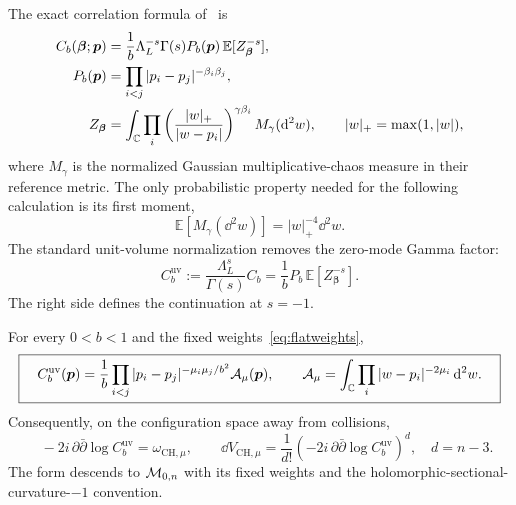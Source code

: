 The exact correlation formula of~\cite[eqs.~(2.11)--(2.15)]{KRV}
is
\begin{align}
 C_b(\boldsymbol\beta;\boldsymbol p)
   &=\frac1b\Lambda_L^{-s}\Gamma(s)
      P_b(\boldsymbol p)\,\mathbb E[Z_{\boldsymbol\beta}^{-s}],
       \label{eq:LiouvilleGMC}\\
 P_b(\boldsymbol p)
   &=\prod_{i<j}|p_i-p_j|^{-\beta_i\beta_j},\notag\\
 Z_{\boldsymbol\beta}
   &=\int_{\mathbb C}\prod_i
       \left(\frac{|w|_+}{|w-p_i|}\right)^{\gamma\beta_i}
       M_\gamma(\mathop{}\!\mathrm d^2w),\qquad |w|_+=\max(1,|w|),\notag
\end{align}
where $M_\gamma$ is the normalized Gaussian multiplicative-chaos
measure in their reference metric. The only probabilistic property
needed for the following calculation is its first moment,
\begin{equation}
 \mathbb E[M_\gamma(\dd^2w)]=|w|_+^{-4}\dd^2w.
 \label{eq:GMCfirstmoment}
\end{equation}
The standard unit-volume normalization removes the zero-mode
Gamma factor:
\begin{equation}
 C_b^{\mathrm{uv}}
       :=\frac{\Lambda_L^s}{\Gamma(s)}C_b
        =\frac1b P_b\,\mathbb E[Z_{\boldsymbol\beta}^{-s}].
 \label{eq:unitvolumeLiouville}
\end{equation}
The right side defines the continuation at $s=-1$.

\begin{proposition}
For every $0<b<1$ and the fixed weights~\eqref{eq:flatweights},
\begin{equation}
 \boxed{\quad
 C_b^{\mathrm{uv}}(\boldsymbol p)
   =\frac1b\prod_{i<j}|p_i-p_j|^{-\mu_i\mu_j/b^2}
       \mathcal A_\mu(\boldsymbol p),\qquad
 \mathcal A_\mu=\int_{\mathbb C}\prod_i|w-p_i|^{-2\mu_i}\mathop{}\!\mathrm d^2w.
 \quad}
 \label{eq:exactLiouvilleDM}
\end{equation}
Consequently, on the configuration space away from collisions,
\begin{equation}
 \boxed{\quad
 -2i\,\partial\bar\partial\log C_b^{\mathrm{uv}}
       =\omega_{\mathrm{CH},\mu},\qquad
 \dd V_{\mathrm{CH},\mu}
       =\frac1{d!}\left(-2i\,\partial\bar\partial
                            \log C_b^{\mathrm{uv}}\right)^d,
 \quad d=n-3.}
 \label{eq:exactLiouvillecurvature}
\end{equation}
The form descends to $\mathcal M_{0,n}$ with its fixed weights and the
holomorphic-sectional-curvature-$-1$ convention.
\end{proposition}

